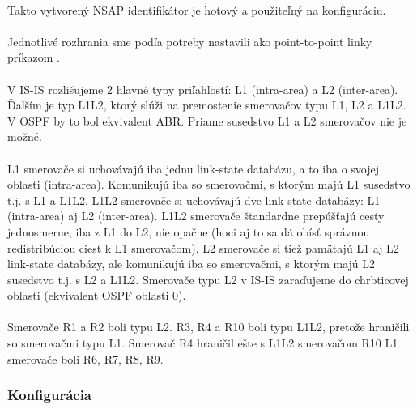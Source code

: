 \documentclass[12pt,twoside,a4paper]{report}
\begin{document}
\paragraph{}
Takto vytvorený NSAP identifikátor je hotový a použiteľný na konfiguráciu.

\paragraph{}
Jednotlivé rozhrania sme podľa potreby nastavili ako point-to-point linky príkazom .

\paragraph{}
V IS-IS rozlišujeme 2 hlavné typy priľahlostí: L1 (intra-area) a L2 (inter-area). Ďalším je typ L1L2, ktorý slúži na premostenie smerovačov typu L1, L2 a L1L2. V OSPF by to bol ekvivalent ABR. Priame susedstvo L1 a L2 smerovačov nie je možné.

\paragraph{}
L1 smerovače si uchovávajú iba jednu link-state databázu, a to iba o svojej oblasti (intra-area). Komunikujú iba so smerovačmi, s ktorým majú L1 susedstvo t.j. s L1 a L1L2. L1L2 smerovače si uchovávajú dve link-state databázy: L1 (intra-area) aj L2 (inter-area). L1L2 smerovače štandardne prepúšťajú cesty jednosmerne, iba z L1 do L2, nie opačne (hoci aj to sa dá obísť správnou redistribúciou ciest k L1 smerovačom). L2 smerovače si tiež pamätajú L1 aj L2 link-state databázy, ale komunikujú iba so smerovačmi, s ktorým majú L2 susedstvo t.j. s L2 a L1L2. Smerovače typu L2 v IS-IS zaraďujeme do chrbticovej oblasti (ekvivalent OSPF oblasti 0).

\paragraph{}
Smerovače R1 a R2 boli typu L2. R3, R4 a R10 boli typu L1L2, pretože hraničili so smerovačmi typu L1. Smerovač R4 hraničil ešte s L1L2 smerovačom R10 L1 smerovače boli R6, R7, R8, R9.


\subsubsection{Konfigurácia}
\end{document}
